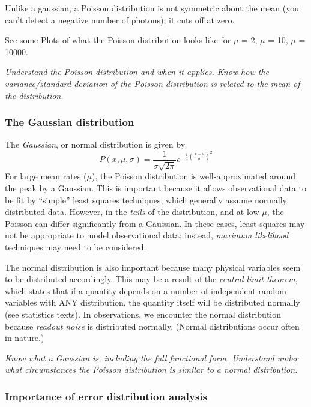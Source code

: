 \documentclass[12pt]{article}
\newcommand{\mynotes}[1]{\textcolor{myBlue}{#1}}
\newcommand{\test}[1]{%
    \begin{center}
        {\parbox{0.9\textwidth}{\textit{\small#1}}}
    \end{center}}
\begin{document}
\mynotes{Unlike a gaussian, a Poisson distribution is not symmetric about the
mean (you can't detect a negative number of photons); it cuts off at zero.}

See some \href{http://astronomy.nmsu.edu/holtz/a535/html/diagrams/a535/poisson.htm}
{Plots} of what the Poisson distribution looks like
for $\mu$ = 2, $\mu$ = 10, $\mu$ = 10000.

\test{Understand the Poisson distribution and when it applies. Know how the
variance/standard deviation of the Poisson distribution is related to the mean
of the distribution.}

\subsubsection{The Gaussian distribution}
The \textit{Gaussian}, or normal distribution is given by
\[
    P(x,\mu,\sigma) = \frac{1}{\sigma\sqrt{2\pi}}
    e^{ -\frac{1}{2} (\frac{x-\mu}{\sigma})^{2} }
    \]
For large mean rates ($\mu$), the Poisson distribution is well-approximated
around the peak by a Gaussian. This is important because it allows
observational data to be fit by ``simple'' least squares techniques, which
generally assume normally distributed data. However, in the \emph{tails} of the
distribution, and at low $\mu$, the Poisson can differ significantly from a
Gaussian. In these cases, least-squares may not be appropriate to model
observational data; instead, \textit{maximum likelihood} techniques may need to
be considered.

The normal distribution is also important because many physical variables seem
to be distributed accordingly. This may be a result of the \textit{central
limit theorem}, which states that if a quantity depends on a number of
independent random variables with ANY distribution, the quantity itself will be
distributed normally (see statistics texts). In observations, we encounter the
normal distribution because \textit{readout noise} is distributed normally.
\mynotes{(Normal distributions occur often in nature.)}

\test{Know what a Gaussian is, including the full functional form. Understand
under what circumstances the Poisson distribution is similar to a normal
distribution.}

\subsubsection{Importance of error distribution analysis}
\end{document}
